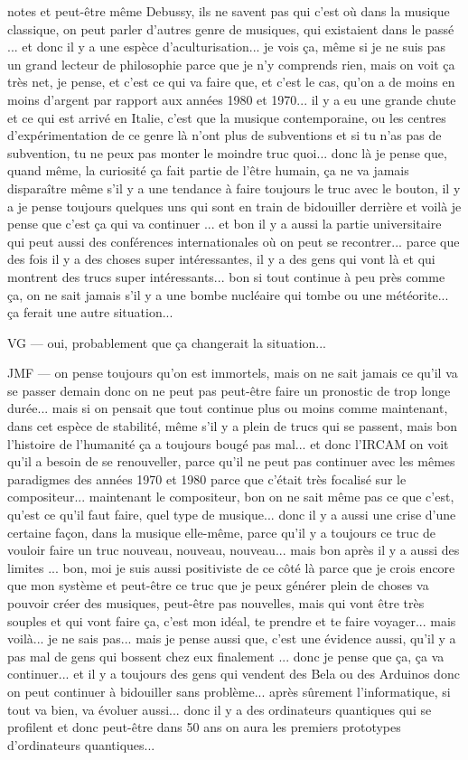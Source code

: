 notes et peut-être même Debussy, ils ne savent pas qui c'est où dans la musique classique, on peut parler d'autres genre de musiques, qui existaient dans le passé ... et donc il y a une espèce d'aculturisation... je vois ça, même si je ne suis pas un grand lecteur de philosophie parce que je n'y comprends rien, mais on voit ça très net, je pense, et c'est ce qui va faire que, et c'est le cas, qu'on a de moins en moins d'argent par rapport aux années 1980 et 1970... il y a eu une grande chute et ce qui est arrivé en Italie, c'est que la musique contemporaine, ou les centres d'expérimentation de ce genre là n'ont plus de subventions et si tu n'as pas de subvention, tu ne peux pas monter le moindre truc quoi... donc là je pense que, quand même, la curiosité ça fait partie de l'être humain, ça ne va jamais disparaître même s'il y a une tendance à faire toujours le truc avec le bouton, il y a je pense toujours quelques uns qui sont en train de bidouiller derrière et voilà je pense que c'est ça qui va continuer ... et bon il y a aussi la partie universitaire qui peut aussi des conférences internationales où on peut se recontrer... parce que des fois il y a des choses super intéressantes, il y a des gens qui vont là et qui montrent des trucs super intéressants... bon si tout continue à peu près comme ça, on ne sait jamais s'il y a une bombe nucléaire qui tombe ou une météorite... ça ferait une autre situation... 

VG — oui, probablement que ça changerait la situation... 

JMF — on pense toujours qu'on est immortels, mais on ne sait jamais ce qu'il va se passer demain donc on ne peut pas peut-être faire un pronostic de trop longe durée... mais si on pensait que tout continue plus ou moins comme maintenant, dans cet espèce de stabilité, même s'il y a plein de trucs qui se passent, mais bon l'histoire de l'humanité ça a toujours bougé pas mal... et donc l'IRCAM on voit qu'il a besoin de se renouveller, parce qu'il ne peut pas continuer avec les mêmes paradigmes des années 1970 et 1980 parce que c'était très focalisé sur le compositeur... maintenant le compositeur, bon on ne sait même pas ce que c'est, qu'est ce qu'il faut faire, quel type de musique... donc il y a aussi une crise d'une certaine façon, dans la musique elle-même, parce qu'il y a toujours ce truc de vouloir faire un truc nouveau, nouveau, nouveau... mais bon après il y a aussi des limites ... bon, moi je suis aussi positiviste de ce côté là parce que je crois encore que mon système et peut-être ce truc que je peux générer plein de choses va pouvoir créer des musiques, peut-être pas nouvelles, mais qui vont être très souples et qui vont faire ça, c'est mon idéal, te prendre et te faire voyager... mais voilà... je ne sais pas... mais je pense aussi que, c'est une évidence aussi, qu'il y a pas mal de gens qui bossent chez eux finalement ... donc je pense que ça, ça va continuer... et il y a toujours des gens qui vendent des Bela ou des Arduinos donc on peut continuer à bidouiller sans problème... après sûrement l'informatique, si tout va bien, va évoluer aussi... donc il y a des ordinateurs quantiques qui se profilent et donc peut-être dans 50 ans on aura les premiers prototypes d'ordinateurs quantiques... 


